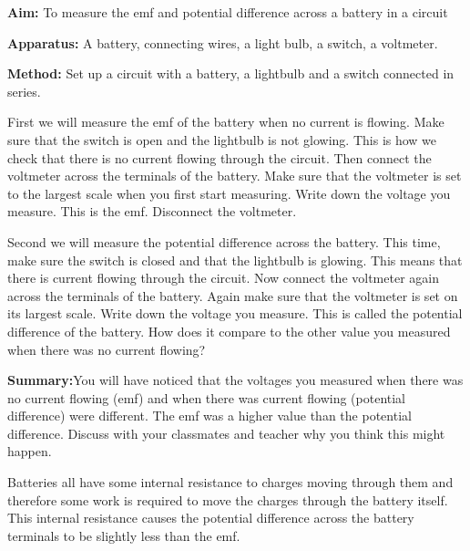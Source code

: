 	  \label{m38772*parasar1}\noindent{}\textbf{Aim:} To measure the emf and potential difference across a battery in a circuit\par 
	  \label{m38772*parasar11}\noindent{}\textbf{Apparatus:} A battery, connecting wires, a light bulb, a switch, a voltmeter.\par 
	  \label{m38772*parasar111}\noindent{}\textbf{Method: } Set up a circuit with a battery, a lightbulb and a switch connected in series.\par 
	       \label{m38772*parasar11111}First we will measure the emf of the battery when no current is flowing. Make sure that the switch is open and the lightbulb is not glowing. This is how we check that there is no current flowing through the circuit. Then connect the voltmeter across the terminals of the battery. Make sure that the voltmeter is set to the largest scale when you first start measuring. Write down the voltage you measure. This is the emf. Disconnect the voltmeter.\par 
	       \label{m38772*parasar15}Second we will measure the potential difference across the battery. This time, make sure the switch is closed and that the lightbulb is glowing. This means that there is current flowing through the circuit. Now connect the voltmeter again across the terminals of the battery. Again make sure that the voltmeter is set on its largest scale. Write down the voltage you measure. This is called the potential difference of the battery. How does it compare to the other value you measured when there was no current flowing?\par 
	  \label{m38772*parasar221}\noindent{}\textbf{Summary:}You will have noticed that the voltages you measured when there was no current flowing (emf) and when there was current flowing (potential difference) were different. The emf was a higher value than the potential difference. Discuss with your classmates and teacher why you think this might happen.\par 
	  

	\label{m38772*parasar13}
	  Batteries all have some internal resistance to charges moving through them and therefore some work is required to move the charges through the battery itself. This internal resistance causes the potential difference across the battery terminals to be slightly less than the emf. 
	\par   



